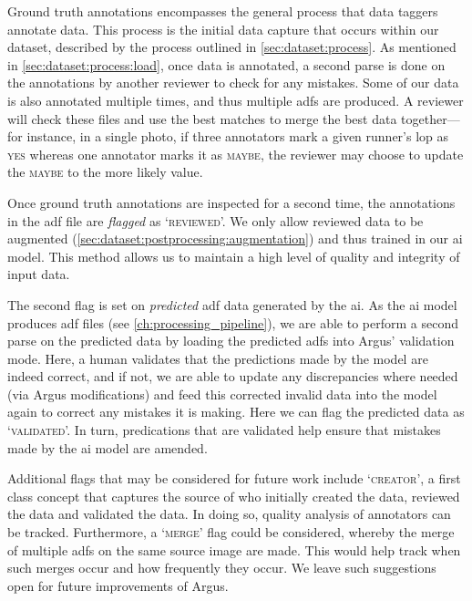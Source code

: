 Ground truth annotations encompasses the general process that data taggers annotate data. This process is the initial data capture that occurs within our dataset, described by the process outlined in \cref{sec:dataset:process}. As mentioned in \cref{sec:dataset:process:load}, once data is annotated, a second parse is done on the annotations by another reviewer to check for any mistakes. Some of our data is also annotated multiple times, and thus multiple \glspl{adf} are produced. A reviewer will check these files and use the best matches to merge the best data together---for instance, in a single photo, if three annotators mark a given runner's \gls{lop} as \textsc{yes} whereas one annotator marks it as \textsc{maybe}, the reviewer may choose to update the \textsc{maybe} to the more likely value.

Once ground truth annotations are inspected for a second time, the annotations in the \gls{adf} file are \textit{flagged} as `\textsc{reviewed}'. We only allow reviewed data to be augmented (\cref{sec:dataset:postprocessing:augmentation}) and thus trained in our \gls{ai} model. This method allows us to maintain a high level of quality and integrity of input data.

The second flag is set on \textit{predicted} \gls{adf} data generated by the \gls{ai}. As the \gls{ai} model produces \gls{adf} files (see \cref{ch:processing_pipeline}), we are able to perform a second parse on the predicted data by loading the predicted \glspl{adf} into Argus' validation mode. Here, a human validates that the predictions made by the model are indeed correct, and if not, we are able to update any discrepancies where needed (via Argus modifications) and feed this corrected invalid data into the model again to correct any mistakes it is making. Here we can flag the predicted data as `\textsc{validated}'. In turn, predications that are validated help ensure that mistakes made by the \gls{ai} model are amended. 

Additional flags that may be considered for future work include `\textsc{creator}', a first class concept that captures the source of who initially created the data, reviewed the data and validated the data. In doing so, quality analysis of annotators can be tracked. Furthermore, a `\textsc{merge}' flag could be considered, whereby the merge of multiple \glspl{adf} on the same source image are made. This would help track when such merges occur and how frequently they occur. We leave such suggestions open for future improvements of Argus.

